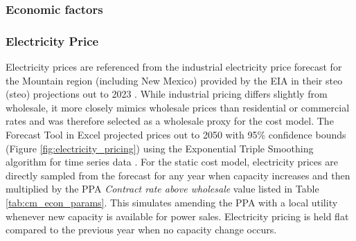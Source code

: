\subsubsection{Economic factors}\label{ch4:econ_params}

\begin{table}[H]
\centering
{}
\caption[Cost model parameters for economics]{Parameters related to economic factors in the cost model}
\label{tab:cm_econ_params}
\end{table}

\subsubsection{Electricity Price}\label{ch4:elec_price}

Electricity prices are referenced from the industrial electricity price forecast for the Mountain region (including New Mexico) provided by the EIA in their \acrlong{steo} (\acrshort{steo}) projections out to 2023 \citep{eia_short-term_2021}. While industrial pricing differs slightly from wholesale, it more closely mimics wholesale prices than residential or commercial rates and was therefore selected as a wholesale proxy for the cost model. The Forecast Tool in Excel projected prices out to 2050 with 95\% confidence bounds (Figure \ref{fig:electricity_pricing}) using the Exponential Triple Smoothing algorithm for time series data \citep{microsoft_forecastets_2021}. For the static cost model, electricity prices are directly sampled from the forecast for any year when capacity increases and then multiplied by the PPA \textit{Contract rate above wholesale} value listed in Table \ref{tab:cm_econ_params}. This simulates amending the PPA with a local utility whenever new capacity is available for power sales. Electricity pricing is held flat compared to the previous year when no capacity change occurs.

